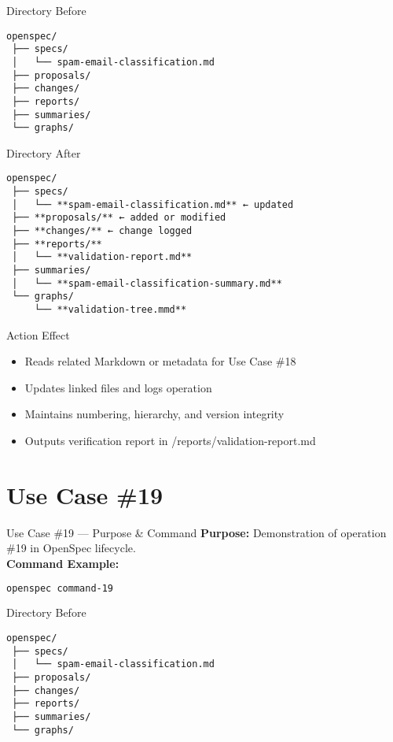 \documentclass[aspectratio=169]{beamer}
\begin{document}
\begin{frame}{Directory Before}
\begin{lstlisting}
openspec/
 ├── specs/
 │   └── spam-email-classification.md
 ├── proposals/
 ├── changes/
 ├── reports/
 ├── summaries/
 └── graphs/
\end{lstlisting}
\end{frame}

\begin{frame}{Directory After}
\begin{lstlisting}
openspec/
 ├── specs/
 │   └── **spam-email-classification.md** ← updated
 ├── **proposals/** ← added or modified
 ├── **changes/** ← change logged
 ├── **reports/**
 │   └── **validation-report.md**
 ├── summaries/
 │   └── **spam-email-classification-summary.md**
 └── graphs/
     └── **validation-tree.mmd**
\end{lstlisting}
\end{frame}

\begin{frame}{Action Effect}
\begin{itemize}
  \item Reads related Markdown or metadata for Use Case \#18
  \item Updates linked files and logs operation
  \item Maintains numbering, hierarchy, and version integrity
  \item Outputs verification report in /reports/validation-report.md
\end{itemize}
\end{frame}

\section*{Use Case \#19}
\begin{frame}{Use Case \#19 --- Purpose \& Command}
\textbf{Purpose:} Demonstration of operation \#19 in OpenSpec lifecycle.\\[4pt]
\textbf{Command Example:}
\begin{lstlisting}[language=bash]
openspec command-19
\end{lstlisting}
\end{frame}

\begin{frame}{Directory Before}
\begin{lstlisting}
openspec/
 ├── specs/
 │   └── spam-email-classification.md
 ├── proposals/
 ├── changes/
 ├── reports/
 ├── summaries/
 └── graphs/
\end{lstlisting}
\end{frame}
\end{document}
